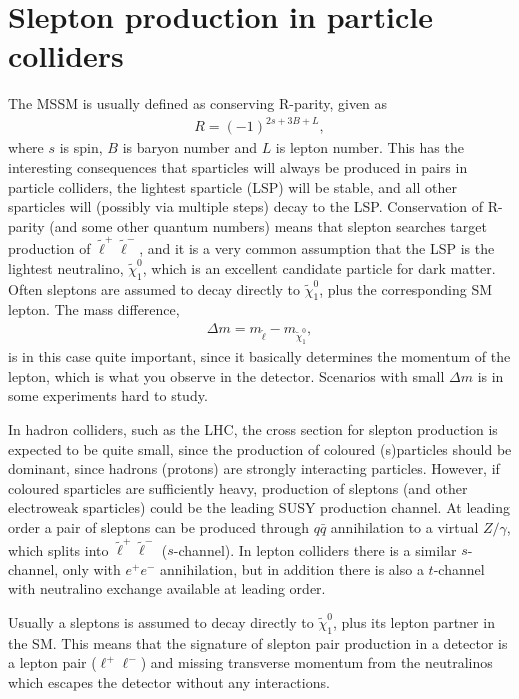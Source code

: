 \documentclass[twocolumn,a4paper,10pt]{article}
\begin{document}
\section{Slepton production in particle colliders}

The MSSM is usually defined as conserving R-parity, given as  
\begin{align*}
R = (-1)^{2s + 3B + L}, 
\end{align*}
where $s$ is spin, $B$ is baryon number and $L$ is lepton number. This has the 
interesting consequences that sparticles will always be produced in pairs in particle colliders, 
the lightest sparticle (LSP) will be stable, and all other sparticles will (possibly via multiple steps) 
decay to the LSP. Conservation of R-parity (and some other quantum numbers) means that slepton searches 
target production of $\tilde{\ell}^+\tilde{\ell}^-$, and it is a very common assumption that the LSP is 
the lightest neutralino, $\tilde{\chi}_1^0$, which is an excellent candidate particle for dark matter. 
Often sleptons are assumed to decay directly to $\tilde{\chi}_1^0$, plus the corresponding SM lepton. 
The mass difference, 
\begin{align}
\Delta m = m_{\tilde{\ell}} - m_{\tilde{\chi}^0_1}, 
\label{eq:delta m}
\end{align}  
is in this case quite important, since it basically determines the momentum of the lepton, which is 
what you observe in the detector. Scenarios with small $\Delta m$ is in some experiments hard to study. 

In hadron colliders, such as the LHC, the cross section for slepton production is expected to be 
quite small, since the production of coloured (s)particles should be dominant, since hadrons (protons) 
are strongly interacting particles. 
However, if coloured sparticles are sufficiently heavy, production of sleptons (and other electroweak 
sparticles) could be the leading SUSY production channel. At leading order a pair of sleptons can be 
produced through $q\bar{q}$ annihilation to a virtual $Z/\gamma$, which splits into 
$\tilde{\ell}^+\tilde{\ell}^-$ ($s$-channel). In lepton colliders there is a similar $s$-channel, only 
with $e^+e^-$ annihilation, but in addition there is also a $t$-channel with neutralino exchange 
available at leading order.  

Usually a sleptons is assumed to decay directly to $\tilde{\chi}_1^0$, plus its lepton partner in the 
SM. This means that the signature of slepton pair production in a detector is a lepton pair 
($\ell^+\ell^-$) and missing transverse momentum from the neutralinos which escapes the detector 
without any interactions.  
\end{document}
